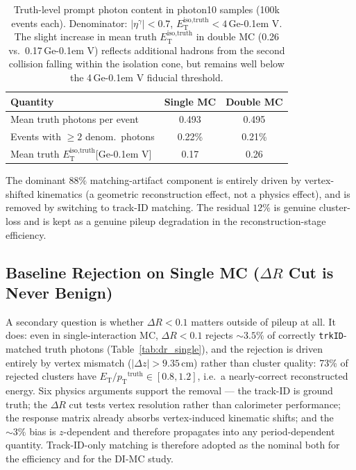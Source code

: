 \documentclass[11pt,a4paper]{article}
\newcommand{\ET}{\ensuremath{E_{\text{T}}}\xspace}
\newcommand{\pT}{\ensuremath{p_{\text{T}}}\xspace}
\newcommand{\isoETtruth}{\ensuremath{E_\text{T}^\text{iso,truth}}\xspace}
\newcommand{\DR}{\ensuremath{\Delta R}\xspace}
\newcommand{\GeV}{\ifmmode {\mathrm{\ Ge\kern -0.1em V}}\else\textrm{Ge\kern -0.1em V}\fi\xspace}
\begin{document}
\begin{table}[H]
    \centering
    \caption{Truth-level prompt photon content in photon10 samples
      (100k events each). Denominator: $|\eta^\gamma|<0.7$,
      $\isoETtruth<4$\,\GeV. The slight increase in mean truth
      $\isoETtruth$ in double MC (0.26 vs.\ 0.17\,\GeV) reflects
      additional hadrons from the second collision falling within the
      isolation cone, but remains well below the 4\,\GeV fiducial
      threshold.}
    \label{tab:truth_content}
    \begin{tabular}{lcc}
        \toprule
        Quantity & Single MC & Double MC \\
        \midrule
        Mean truth photons per event & 0.493 & 0.495 \\
        Events with $\geq 2$ denom.\ photons & 0.22\% & 0.21\% \\
        Mean truth \isoETtruth [\GeV] & 0.17 & 0.26 \\
        \bottomrule
    \end{tabular}
\end{table}

The dominant $88\%$ matching-artifact component is entirely driven by
vertex-shifted kinematics (a geometric reconstruction effect, not a
physics effect), and is removed by switching to track-ID matching. The
residual $12\%$ is genuine cluster-loss and is kept as a
genuine pileup degradation in the reconstruction-stage efficiency.

\subsection{Baseline Rejection on Single MC (\DR Cut is Never Benign)}
\label{subsec:single_mc_baseline}

A secondary question is whether $\DR<0.1$ matters outside of pileup
at all. It does: even in single-interaction MC, $\DR<0.1$ rejects
$\sim\!3.5\%$ of correctly \texttt{trkID}-matched truth photons
(Table~\ref{tab:dr_single}), and the rejection is driven entirely by
vertex mismatch ($|\Delta z|>9.35$\,cm) rather than cluster quality:
73\% of rejected clusters have $\ET/\pT^{\text{truth}}\in[0.8,1.2]$,
i.e.\ a nearly-correct reconstructed energy. Six physics arguments
support the removal --- the track-ID is ground truth; the $\DR$ cut
tests vertex resolution rather than calorimeter performance; the
response matrix already absorbs vertex-induced kinematic shifts; and
the $\sim\!3\%$ bias is $z$-dependent and therefore propagates into
any period-dependent quantity. Track-ID-only matching is therefore
adopted as the nominal both for the efficiency and for the DI-MC
study.
\end{document}
